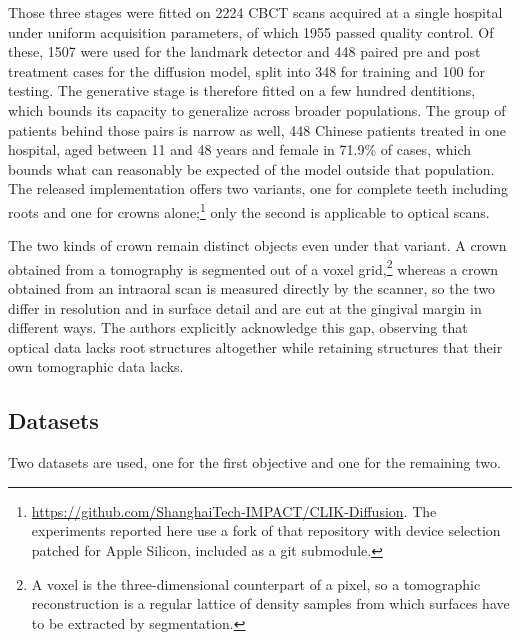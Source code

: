 \documentclass[10pt,a4paper]{article}
\begin{document}
Those three stages were fitted on 2224 CBCT scans acquired at a single hospital under uniform acquisition parameters, of which 1955 passed quality control. Of these, 1507 were used for the landmark detector and 448 paired pre and post treatment cases for the diffusion model, split into 348 for training and 100 for testing. The generative stage is therefore fitted on a few hundred dentitions, which bounds its capacity to generalize across broader populations. The group of patients behind those pairs is narrow as well, 448 Chinese patients treated in one hospital, aged between 11 and 48 years and female in 71.9\% of cases, which bounds what can reasonably be expected of the model outside that population. The released implementation offers two variants, one for complete teeth including roots and one for crowns alone;\footnote{\url{https://github.com/ShanghaiTech-IMPACT/CLIK-Diffusion}. The experiments reported here use a fork of that repository with device selection patched for Apple Silicon, included as a git submodule.} only the second is applicable to optical scans.

The two kinds of crown remain distinct objects even under that variant. A crown obtained from a tomography is segmented out of a voxel grid,\footnote{A voxel is the three-dimensional counterpart of a pixel, so a tomographic reconstruction is a regular lattice of density samples from which surfaces have to be extracted by segmentation.} whereas a crown obtained from an intraoral scan is measured directly by the scanner, so the two differ in resolution and in surface detail and are cut at the gingival margin in different ways. The authors explicitly acknowledge this gap, observing that optical data lacks root structures altogether while retaining structures that their own tomographic data lacks.

\subsection{Datasets}

Two datasets are used, one for the first objective and one for the remaining two.
\end{document}
